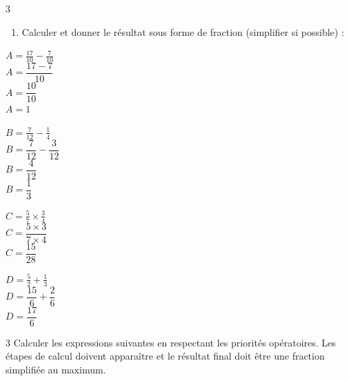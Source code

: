 \documentclass[a4paper]{book}
\begin{document}
{\begin{exerciceNote}{3}
\begin{enumerate}
            \bigskip
            
            \item Calculer et donner le résultat sous forme de fraction (simplifier si possible) :
        \end{enumerate}
        
        \smallskip
        \begin{minipage}[t]{0.23\textwidth}
            $A = \frac{17}{10} - \frac{7}{10}$ \\
            \color{red}\bfseries
            $A = \dfrac{17 - 7}{10}$ \\
            $A = \dfrac{10}{10}$ \\
            $A = 1$
            \vspace{0.7cm}
        \end{minipage}\hfill \vline \hfill
        \begin{minipage}[t]{0.23\textwidth}
            $B = \frac{7}{12} - \frac{1}{4}$ \\
            \color{red}\bfseries
            $B = \dfrac{7}{12} - \dfrac{3}{12}$ \\
            $B = \dfrac{4}{12}$ \\
            $B = \dfrac{1}{3}$
            \vspace{0.7cm}
        \end{minipage}\hfill \vline \hfill
        \begin{minipage}[t]{0.23\textwidth}
            $C = \frac{5}{7} \times \frac{3}{4}$ \\
            \color{red}\bfseries
            $C = \dfrac{5 \times 3}{7 \times 4}$ \\
            $C = \dfrac{15}{28}$
            \vspace{1.5cm}
        \end{minipage}\hfill \vline \hfill
        \begin{minipage}[t]{0.23\textwidth}
            $D = \frac{5}{2}+\frac{1}{3}$ \\
            \color{red}\bfseries
            $D = \dfrac{15}{6} + \dfrac{2}{6}$ \\
            $D = \dfrac{17}{6}$
            \vspace{1.1cm}
        \end{minipage}
    \end{exerciceNote}

\newpage
    
    \begin{exerciceNote}{3}
        Calculer les expressions suivantes en respectant les priorités opératoires. Les étapes de calcul doivent apparaître et le résultat final doit être une fraction simplifiée au maximum.
        

\end{exerciceNote}}
\end{document}
